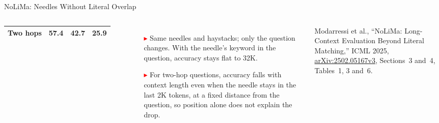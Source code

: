 \begin{frame}{NoLiMa: Needles Without Literal Overlap}
\begin{columns}[T,onlytextwidth]
{\begin{tabular}{lrrr}
        Two hops & 57.4 & 42.7 & 25.9 \\
        \bottomrule
      \end{tabular}\par}
      \vspace{0.6em}
      \begin{itemize}\scriptsize\itemsep0.3em
        \item[\textcolor{red}{$\blacktriangleright$}] Same needles and haystacks; only the question changes. With the needle's keyword in the question, accuracy stays flat to 32K.
        \item[\textcolor{red}{$\blacktriangleright$}] For two-hop questions, accuracy falls with context length even when the needle stays in the last 2K tokens, at a fixed distance from the question, so position alone does not explain the drop.
      \end{itemize}
      \vspace{0.3em}
      {\scriptsize Modarressi et al., ``NoLiMa: Long-Context Evaluation Beyond Literal Matching,'' ICML 2025, \href{https://arxiv.org/abs/2502.05167v3}{arXiv:2502.05167v3}, Sections~3 and~4, Tables~1, 3 and~6.\par}
  \end{columns}
\end{frame}

